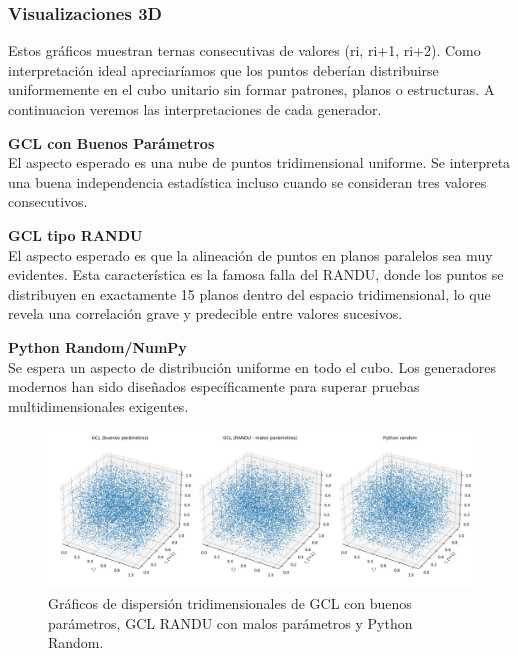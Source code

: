 \documentclass{article}
\begin{document}
\subsubsection{Visualizaciones 3D}
Estos gráficos muestran ternas consecutivas de valores (ri, ri+1, ri+2).
Como interpretación ideal apreciaríamos que los puntos deberían distribuirse uniformemente en el cubo unitario sin formar patrones, planos o estructuras.
A continuacion veremos las interpretaciones de cada generador.

\noindent
\begin{minipage}[t]{0.32\textwidth}
\textbf{GCL con Buenos Parámetros}  \\
El aspecto esperado es una nube de puntos tridimensional uniforme.
Se interpreta una buena independencia estadística incluso cuando se consideran tres valores consecutivos.
\end{minipage}
\hfill
\begin{minipage}[t]{0.32\textwidth}
\textbf{GCL tipo RANDU}  \\
El aspecto esperado es que la alineación de puntos en planos paralelos sea muy evidentes. Esta característica es la famosa falla del RANDU, donde los puntos se distribuyen en exactamente 15 planos dentro del espacio tridimensional, lo que revela una correlación grave y predecible entre valores sucesivos. 
\end{minipage}
\hfill
\begin{minipage}[t]{0.32\textwidth}
\textbf{Python Random/NumPy}  \\
Se espera un aspecto de distribución uniforme en todo el cubo.
Los generadores modernos han sido diseñados específicamente para superar pruebas multidimensionales exigentes.
\end{minipage}

\begin{figure}[H]
\centering
\includegraphics[width=1\textwidth]{Imagenes/comparacion_3d.png}
\caption{Gráficos de dispersión tridimensionales de GCL con buenos parámetros, GCL RANDU con malos parámetros y Python Random.}
\end{figure}
\end{document}

